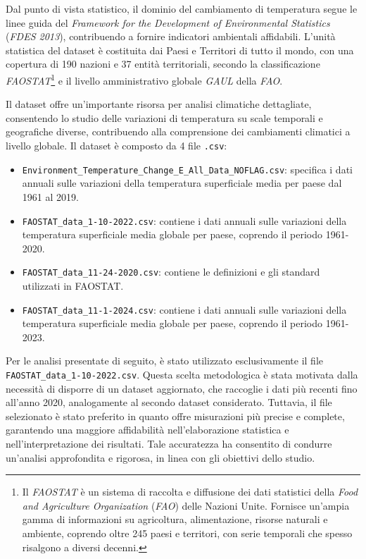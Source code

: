 Dal punto di vista statistico, il dominio del cambiamento di temperatura segue le linee guida del \textit{Framework for the Development of Environmental Statistics} (\textit{FDES 2013}), contribuendo a fornire indicatori ambientali affidabili. L'unità statistica del dataset è costituita dai Paesi e Territori di tutto il mondo, con una copertura di 190 nazioni e 37 entità territoriali, secondo la classificazione \textit{FAOSTAT}\footnote{Il \textit{FAOSTAT} è un sistema di raccolta e diffusione dei dati statistici della \textit{Food and Agriculture Organization} (\textit{FAO}) delle Nazioni Unite. Fornisce un'ampia gamma di informazioni su agricoltura, alimentazione, risorse naturali e ambiente, coprendo oltre 245 paesi e territori, con serie temporali che spesso risalgono a diversi decenni.} e il livello amministrativo globale \textit{GAUL} della \textit{FAO}.

Il dataset offre un'importante risorsa per analisi climatiche dettagliate, consentendo lo studio delle variazioni di temperatura su scale temporali e geografiche diverse, contribuendo alla comprensione dei cambiamenti climatici a livello globale.
\newpage
Il dataset è composto da 4 file \texttt{.csv}:
\vspace{2mm}

\begin{itemize}
    \item\texttt{Environment\_Temperature\_Change\_E\_All\_Data\_NOFLAG.csv}: specifica i dati annuali sulle variazioni della temperatura superficiale media per paese dal 1961 al 2019.
    \item \texttt{FAOSTAT\_data\_1-10-2022.csv}: contiene i dati annuali sulle variazioni della temperatura superficiale media globale per paese, coprendo il periodo 1961-2020.
    \item \texttt{FAOSTAT\_data\_11-24-2020.csv}: contiene le definizioni e gli standard utilizzati in FAOSTAT.
    \item \texttt{FAOSTAT\_data\_11-1-2024.csv}: contiene i dati annuali sulle variazioni della temperatura superficiale media globale per paese, coprendo il periodo 1961-2023.
\end{itemize}
\vspace{2mm}
 Per le analisi presentate di seguito, è stato utilizzato esclusivamente il file \texttt{FAOSTAT\_data\_1-10-2022.csv}. Questa scelta metodologica è stata motivata dalla necessità di disporre di un dataset aggiornato, che raccoglie i dati più recenti fino all'anno 2020, analogamente al secondo dataset considerato. Tuttavia, il file selezionato è stato preferito in quanto offre misurazioni più precise e complete, garantendo una maggiore affidabilità nell'elaborazione statistica e nell'interpretazione dei risultati. Tale accuratezza ha consentito di condurre un'analisi approfondita e rigorosa, in linea con gli obiettivi dello studio.

